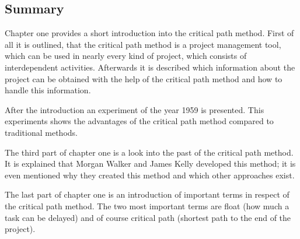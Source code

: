\subsection{Summary}
Chapter one provides a short introduction into the critical path method. First of all it is
outlined, that the critical path method is a project management tool, which can be used in nearly
every kind of project, which consists of interdependent activities. Afterwards it is described which
information about the project can be obtained with the help of the critical path method and how to
handle this information.  

After the introduction an experiment of the year 1959 is presented. This experiments shows the
advantages of the critical path method compared to traditional methods. 

The third part of chapter one is a look into the past of the critical path method. It is explained
that Morgan Walker and James Kelly developed this method; it is even mentioned why they created this
method and which other approaches exist.  

The last part of chapter one is an introduction of important terms in respect of the critical path
method. The two most important terms are float (how much a task can be delayed) and of course
critical path (shortest path to the end of the project)\cite{santiago}.
